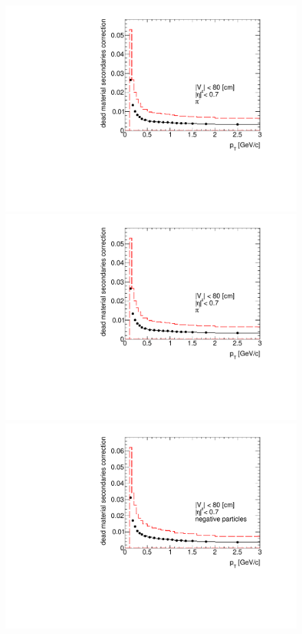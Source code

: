 \begin{figure}[hb]
{		\includegraphics[width=\linewidth,page=5]{graphics/systematicsEfficiency/deadMaterial/secondaries_Unbinned_SD_1D.pdf}\\
		\includegraphics[width=\linewidth,page=6]{graphics/systematicsEfficiency/deadMaterial/secondaries_Unbinned_SD_1D.pdf}\\
		\includegraphics[width=\linewidth,page=2]{graphics/systematicsEfficiency/deadMaterial/secondaries_Unbinned_Charged_SD1D.pdf}
	}%
\end{figure}
